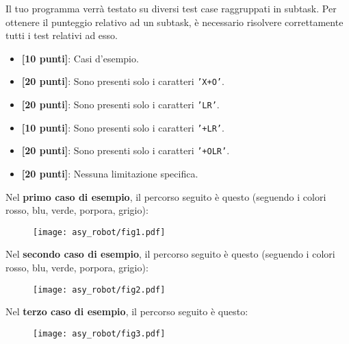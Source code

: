 \Scoring
Il tuo programma verrà testato su diversi test case raggruppati in subtask.
Per ottenere il punteggio relativo ad un subtask, è necessario risolvere
correttamente tutti i test relativi ad esso.

\begin{itemize}[nolistsep,itemsep=2mm]
  \item \textbf{ [10 punti]}: Casi d'esempio.
  \item \textbf{ [20 punti]}: Sono presenti solo i caratteri \texttt{'X+O'}.
  \item \textbf{ [20 punti]}: Sono presenti solo i caratteri \texttt{'LR'}.
  \item \textbf{ [10 punti]}: Sono presenti solo i caratteri \texttt{'+LR'}.
  \item \textbf{ [20 punti]}: Sono presenti solo i caratteri \texttt{'+OLR'}.
  \item \textbf{ [20 punti]}: Nessuna limitazione specifica.
\end{itemize}



\Examples
\begin{example}
%
%
%
\end{example}


\pagebreak
\Explanation
Nel \textbf{primo caso di esempio}, il percorso seguito è questo (seguendo i colori rosso, blu, verde, porpora, grigio):\\[2mm]
\begin{figure}[H]%
\centering\texttt{[image: asy\_robot/fig1.pdf]}%
\end{figure}
Nel \textbf{secondo caso di esempio}, il percorso seguito è questo (seguendo i colori rosso, blu, verde, porpora, grigio):\\[2mm]
\begin{figure}[H]%
\centering\texttt{[image: asy\_robot/fig2.pdf]}%
\end{figure}
\pagebreak
Nel \textbf{terzo caso di esempio}, il percorso seguito è questo:
\begin{figure}[H]%
\centering\texttt{[image: asy\_robot/fig3.pdf]}%
\end{figure}
